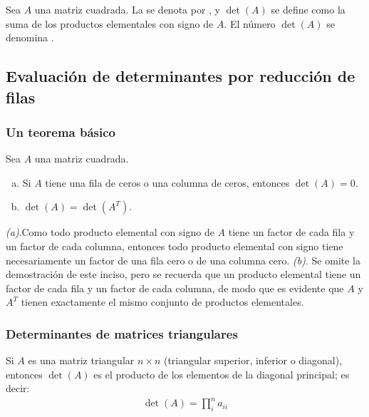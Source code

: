 \documentclass[a4paper,12pt]{article}
\begin{document}
\bigskip

\begin{concept}
  Sea $A$ una matriz cuadrada. La  se denota por
  , y $\det(A)$ se define como la suma de los productos elementales
  con signo de $A$. El número $\det(A)$ se denomina .
\end{concept}

\subsection{Evaluación de determinantes por reducción de filas}

\subsubsection{Un teorema básico}

\begin{theorem}
  Sea $A$ una matriz cuadrada.
  \begin{enumerate}[(a)]
    \item Si $A$ tiene una fila de ceros o una columna de ceros, entonces
      $\det(A)=0$.
    \item $\det(A)=\det(A^T)$.
  \end{enumerate}
  \label{theo:detbasic}
\end{theorem}

\demo \emph{(a)}.Como todo producto elemental con signo de $A$ tiene un factor de cada
fila y un factor de cada columna, entonces todo producto elemental con signo
tiene necesariamente un factor de una fila cero o de una columna cero.
\emph{(b)}. Se omite la demostración de este inciso, pero se recuerda que un
producto elemental tiene un factor de cada fila y un factor de cada columna,
de modo que es evidente que $A$ y $A^T$ tienen exactamente el mismo conjunto
de productos elementales.

\subsubsection{Determinantes de matrices triangulares}

\begin{theorem}
  Si $A$ es una matriz triangular $n\times n$ (triangular superior, inferior o
  diagonal), entonces $\det(A)$ es el producto de los elementos de la diagonal
  principal; es decir:
  \begin{align*}
    \det(A)=\prod_i^n a_{ii}
  \end{align*}
  \label{theo:triangdet}
\end{theorem}
\end{document}
